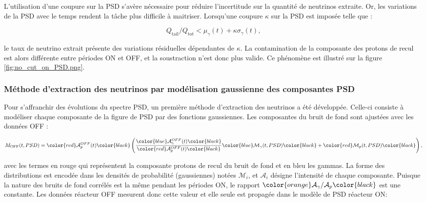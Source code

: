 L'utilisation d'une coupure sur la PSD s'avère nécessaire pour réduire l'incertitude sur la quantité de neutrinos extraite. Or, les variations de la PSD avec le temps rendent la tâche plus difficile à maitriser. Lorsqu'une coupure $\kappa$ sur la PSD est imposée telle que :

\begin{equation}
\label{eq:hard_PSD_cut}
    Q_\textrm{tail}/Q_\textrm{tot} < \mu_\gamma(t) + \kappa \sigma_\gamma(t),
\end{equation}

\bigbreak

le taux de neutrino extrait présente des variations résiduelles dépendantes de $\kappa$. La contamination de la composante des protons de recul est alors différente entre périodes ON et OFF, et la soustraction n'est donc plus valide. Ce phénomène est illustré sur la figure \ref{fig:no_cut_on_PSD.png}.\\

\subsubsection*{Méthode d'extraction des neutrinos par modélisation gaussienne des composantes PSD}
\label{sec:aurelie_nu_extraction}

Pour s'affranchir des évolutions du spectre PSD, un première méthode d'extraction des neutrinos a été développée. Celle-ci consiste à modéliser chaque composante de la figure de PSD par des fonctions gaussiennes. Les composantes du bruit de fond sont ajustées avec les données OFF :

\begin{equation}
    M_\textrm{OFF}(t, PSD) = \color{red}\mathcal{A}^{OFF}_p(t) \color{black} \left( \frac{\color{blue}\mathcal{A}^{OFF}_\gamma(t) \color{black}}{\color{red}\mathcal{A}^{OFF}_p(t)\color{black}}\color{blue} \mathcal{M}_\gamma(t, PSD) \color{black} + \color{red} \mathcal{M}_p(t, PSD)\color{black}\right),
\end{equation}

\bigbreak

avec les termes en rouge qui représentent la composante protons de recul du bruit de fond et en bleu les gammas. La forme des distributions est encodée dans les densités de probabilité (gaussiennes) notées $\mathcal{M}_i$, et $\mathcal{A}_i$ désigne l'intensité de chaque composante. Puisque la nature des bruits de fond corrélés est la même pendant les périodes ON, le rapport $\color{orange}\mathcal{A}_\gamma / \mathcal{A}_p\color{black}$ est une constante. Les données réacteur OFF mesurent donc cette valeur et elle seule est propagée dans le modèle de PSD réacteur ON:

